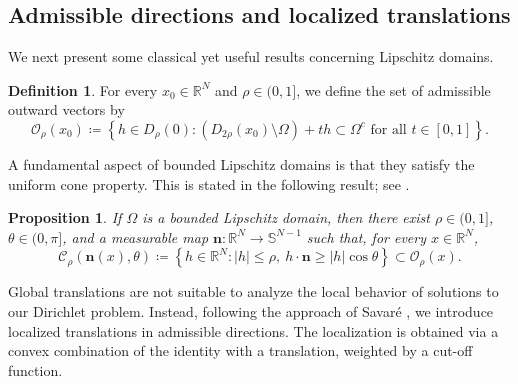 \documentclass[]{amsart}
\newtheorem{proposition}[theorem]{Proposition}
\theoremstyle{definition}
\theoremstyle{definition}
\newtheorem{definition}[theorem]{Definition}
\theoremstyle{remark}
\numberwithin{equation}{section}
\begin{document}
	\subsection{Admissible directions and localized translations}
	
	We next present some classical yet useful results concerning Lipschitz domains.
	
	\begin{definition}
		For every \( x_0 \in \mathbb{R}^N \) and \( \rho \in (0,1] \), we define the set of admissible outward vectors by
		\begin{equation} \label{eq:def-calO}
		\mathcal{O}_\rho(x_0) \coloneqq \left\{ h \in D_\rho (0) :  (D_{2\rho}(x_0) \setminus \Omega) + t h \subset \Omega^c \text{ for all } t \in [0,1] \right\}.
\end{equation}
	\end{definition}
	
	A fundamental  aspect of bounded Lipschitz domains is that they satisfy the uniform cone property. This is stated in the following result; see \cite[Theorem 1.2.2.2]{grisvard1985elliptic}.
	
	\begin{proposition} \label{prop:uniform-cone}
		If \( \Omega \) is a bounded Lipschitz domain, then there exist \( \rho \in (0,1] \), \( \theta \in (0, \pi] \), and a measurable map \( \boldsymbol{n}: \mathbb{R}^N \to \mathbb{S}^{N-1} \) such that, for every \( x \in \mathbb{R}^N \),
		\[
		\mathcal{C}_\rho(\boldsymbol{n}(x), \theta) \coloneq \left\{ h \in \mathbb{R}^N : |h| \leq \rho,\ h \cdot \boldsymbol{n} \geq |h| \cos \theta \right\} \subset \mathcal{O}_\rho(x).
		\]
	\end{proposition}
	
	Global translations are not suitable to analyze the local behavior of solutions to our Dirichlet problem. Instead, following the approach of Savaré \cite{savare1998regularity}, we introduce localized translations in admissible directions. The localization is obtained via a convex combination of the identity with a translation, weighted by a cut-off function.
	
\end{document}

